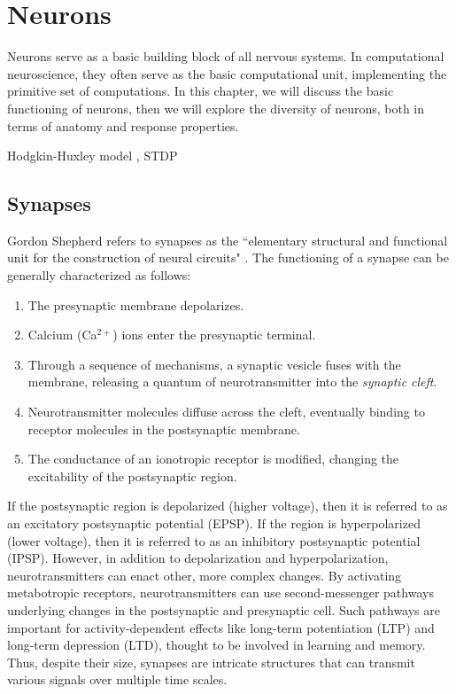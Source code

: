 \chapter{Neurons}
\label{chap: neurons}

Neurons serve as a basic building block of all nervous systems. In computational neuroscience, they often serve as the basic computational unit, implementing the primitive set of computations. In this chapter, we will discuss the basic functioning of neurons, then we will explore the diversity of neurons, both in terms of anatomy and response properties.


Hodgkin-Huxley model \cite{hodgkin1952quantitative}, STDP \cite{markram1997regulation, bi1998synaptic}


\section{Synapses}

Gordon Shepherd refers to synapses as the ``elementary structural and functional unit for the construction of neural circuits" \cite{shepherd2003synaptic}. The functioning of a synapse can be generally characterized as follows:
\begin{enumerate}
    \item The presynaptic membrane depolarizes.
    \item Calcium (Ca$^{2+}$) ions enter the presynaptic terminal.
    \item Through a sequence of mechanisms, a synaptic vesicle fuses with the membrane, releasing a quantum of neurotransmitter into the \textit{synaptic cleft}.
    \item Neurotransmitter molecules diffuse across the cleft, eventually binding to receptor molecules in the postsynaptic membrane.
    \item The conductance of an ionotropic receptor is modified, changing the excitability of the postsynaptic region.
\end{enumerate}
If the postsynaptic region is depolarized (higher voltage), then it is referred to as an excitatory postsynaptic potential (EPSP). If the region is hyperpolarized (lower voltage), then it is referred to as an inhibitory postsynaptic potential (IPSP). However, in addition to depolarization and hyperpolarization, neurotransmitters can enact other, more complex changes. By activating metabotropic receptors, neurotransmitters can use second-messenger pathways underlying changes in the postsynaptic and presynaptic cell. Such pathways are important for activity-dependent effects like long-term potentiation (LTP) and long-term depression (LTD), thought to be involved in learning and memory. Thus, despite their size, synapses are intricate structures that can transmit various signals over multiple time scales.

